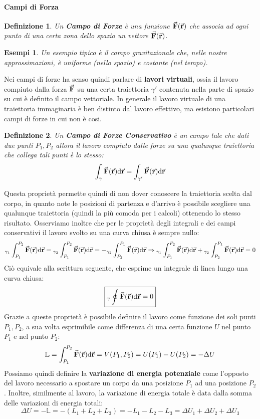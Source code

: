 \documentclass{article}
\newtheorem{defn}{Definizione}[section]
\newtheorem{example}{Esempi}[subsection]
\newcommand{\then}{\ensuremath{\Rightarrow}}
\renewcommand{\r}{\va{r}}
\newcommand{\F}{\va{F}}
\begin{document}
\paragraph{Campi di Forza}
\begin{defn}
Un \textbf{Campo di Forze} è una funzione $\F(\r)$ che associa ad ogni punto di una certa zona dello spazio un vettore $\F(\r)$.
\end{defn}
\begin{example}
Un esempio tipico è il campo gravitazionale che, nelle nostre approssimazioni, è uniforme (nello spazio) e costante (nel tempo).
\end{example}
Nei campi di forze ha senso quindi parlare di \textbf{lavori virtuali}, ossia il lavoro compiuto dalla forza $\F$ su una certa traiettoria $\gamma'$ contenuta nella parte di spazio su cui è definito il campo vettoriale. In generale il lavoro virtuale di una traiettoria immaginaria è ben distinto dal lavoro effettivo, ma esistono particolari campi di forze in cui non è cosi.
\begin{defn}
Un \textbf{Campo di Forze Conservativo} è un campo tale che dati due punti $P_1,P_2$ allora il lavoro compiuto dalle forze su una qualunque traiettoria che collega tali punti è lo stesso:
\[\int_\gamma\F(\r)\dd\r=\int_{\gamma'}\F(\r)\dd\r\]
\end{defn}
Questa proprietà permette quindi di non dover conoscere la traiettoria scelta dal corpo, in quanto note le posizioni di partenza e d'arrivo è possibile scegliere una qualunque traiettoria (quindi la più comoda per i calcoli) ottenendo lo stesso risultato. Osserviamo inoltre che per le proprietà degli integrali e dei campi conservativi il lavoro svolto su una curva chiusa è sempre nullo:
\[ {}_{\gamma_1} \int_{P_1}^{P_2}\F(\r)\dd\r={}_{\gamma_2} \int_{P_1}^{P_2}\F(\r)\dd\r=-{}_{\gamma_2} \int_{P_2}^{P_1}\F(\r)\dd\r\then {}_{\gamma_1}\int_{P_1}^{P_2}\F(\r)\dd\r+{}_{\gamma_2} \int_{P_2}^{P_1}\F(\r)\dd\r=0 \]
Ciò equivale alla scrittura seguente, che esprime un integrale di linea lungo una curva chiusa:
\begin{equation}
    \boxed{{}_\gamma\oint\F(\r)\dd\r=0}
\end{equation}
Grazie a queste proprietà è possibile definire il lavoro come funzione dei soli punti $P_1,P_2$, a sua volta esprimibile come differenza di una certa funzione $U$ nel punto $P_1$ e nel punto $P_2$:
\[\mathbb{L}=\int_{P_1}^{P_2}\F(\r)\dd\r=V(P_1,P_2)=U(P_1)-U(P_2)=-\Delta U\]
Possiamo quindi definire la \textbf{variazione di energia potenziale} come l'opposto del lavoro necessario a spostare un corpo da una posizione $P_1$ ad una posizione $P_2$. Inoltre, similmente al lavoro, la variazione di energia totale è data dalla somma delle variazioni di energia totali:
\[\Delta U=-\mathbb{L}=-(L_1+L_2+L_3)=-L_1-L_2-L_3=\Delta U_1+\Delta U_2+\Delta U_3\]
\end{document}
